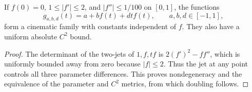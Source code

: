 \begin{lemma}
\label{lem:wz1-cinematic-family}
If $f(0)=0$, $1\leq|f'|\leq2$, and $|f''|\leq1/100$ on
$[0,1]$, the functions
\[
          g_{a,b,d}(t)=a+bf(t)+dtf(t),\qquad a,b,d\in[-1,1],
\]
form a cinematic family with constants independent of $f$.
They also have a uniform absolute $C^2$ bound.
\end{lemma}
\begin{proof}
The determinant of the two-jets of $1,f,tf$ is
$2(f')^2-ff''$, which is uniformly bounded away from zero because
$|f|\leq2$. Thus the jet at any point controls all three parameter
differences. This proves nondegeneracy and the equivalence of the
parameter and $C^2$ metrics, from which doubling follows.
\end{proof}

